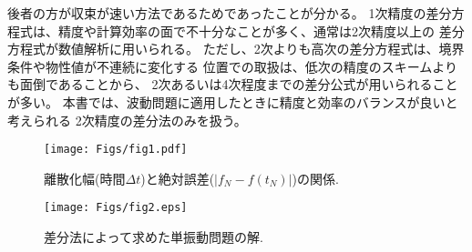 \documentclass[10pt,a4j,dvipdfmx]{jarticle}
\begin{document}
後者の方が収束が速い方法であるためであったことが分かる。
1次精度の差分方程式は、精度や計算効率の面で不十分なことが多く、通常は2次精度以上の
差分方程式が数値解析に用いられる。
ただし、2次よりも高次の差分方程式は、境界条件や物性値が不連続に変化する
位置での取扱は、低次の精度のスキームよりも面倒であることから、
2次あるいは4次程度までの差分公式が用いられることが多い。
本書では、波動問題に適用したときに精度と効率のバランスが良いと考えられる
2次精度の差分法のみを扱う。
\begin{figure}[h]
	\begin{center}
	\texttt{[image: Figs/fig1.pdf]} 
	\end{center}
	\caption{離散化幅(時間$\Delta t$)と絶対誤差($\left| f_N-f(t_N)\right|$)の関係.} 
	\label{fig:fig1}
\end{figure}
\begin{figure}[h]
	\begin{center}
	\texttt{[image: Figs/fig2.eps]} 
	\end{center}
	\caption{差分法によって求めた単振動問題の解.} 
	\label{fig:fig2}
\end{figure}
\\
\end{document}
